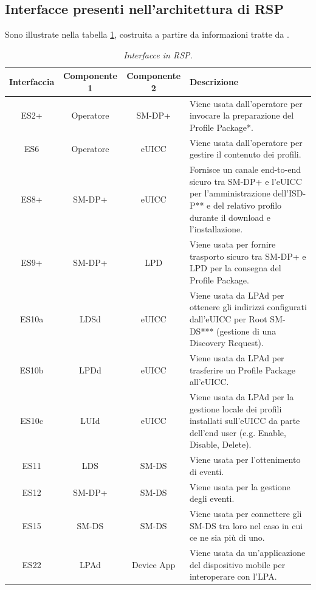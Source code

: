 \documentclass[10pt, oneside]{book}
\begin{document}
\subsection{Interfacce presenti nell'architettura di RSP}
Sono illustrate nella tabella \ref{tab:interfaces}, costruita a partire da informazioni tratte da \cite{GSMA-docs-new}.\\
\begin{table}[h!]
\begin{center}
\captionsetup{skip=4pt}
\caption{\textit{Interfacce in RSP.}}
\label{tab:interfaces}
\begin{tabularx}{\textwidth}{|c|c|c|X|} %
\hline
\textbf{Interfaccia} & \textbf{Componente 1} & \textbf{Componente 2} & \textbf{Descrizione}\\
\hline
ES2+ & Operatore & SM-DP+ & Viene usata dall'operatore per invocare la preparazione del Profile Package*.\\
\hline
ES6 & Operatore & eUICC & Viene usata dall'operatore per gestire il contenuto dei profili.\\
\hline
ES8+ & SM-DP+ & eUICC & Fornisce un canale end-to-end sicuro tra SM-DP+ e l'eUICC per l'amministrazione dell'ISD-P** e del relativo profilo durante il download e l'installazione.\\
\hline
ES9+ & SM-DP+ & LPD & Viene usata per fornire trasporto sicuro tra SM-DP+ e LPD per la consegna del Profile Package.\\
\hline
ES10a & LDSd & eUICC & Viene usata da LPAd per ottenere gli indirizzi configurati dall'eUICC per Root SM-DS*** (gestione di una Discovery Request).\\
\hline
ES10b & LPDd & eUICC & Viene usata da LPAd per trasferire un Profile Package all'eUICC.\\
\hline
ES10c & LUId & eUICC & Viene usata da LPAd per la gestione locale dei profili installati sull'eUICC da parte dell'end user (e.g. Enable, Disable, Delete).\\
\hline
ES11 & LDS & SM-DS & Viene usata per l'ottenimento di eventi.\\
\hline
ES12 & SM-DP+ & SM-DS & Viene usata per la gestione degli eventi.\\
\hline
ES15 & SM-DS & SM-DS & Viene usata per connettere gli SM-DS tra loro nel caso in cui ce ne sia più di uno.\\
\hline
ES22 & LPAd & Device App & Viene usata da un'applicazione del dispositivo mobile per interoperare con l'LPA.\\

\end{tabularx}
\end{center}
\end{table}
\end{document}
